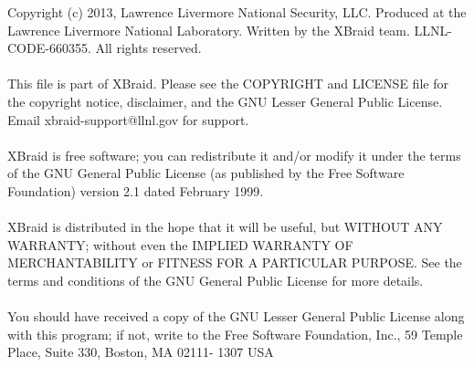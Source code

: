 \documentclass[twoside]{article}
\begin{document}
\begin{titlepage}
Copyright (c) 2013,  Lawrence Livermore National Security, LLC.
Produced at the Lawrence Livermore National Laboratory.
Written by the XBraid team. LLNL-CODE-660355.  All rights reserved.
~\\~\\ 
This file is part of XBraid. Please see the COPYRIGHT and LICENSE file 
for the copyright notice, disclaimer, and the GNU Lesser General Public License.
Email xbraid-support@llnl.gov for support.
~\\~\\
XBraid is free software; you can redistribute it and/or modify it under the
terms of the GNU General Public License (as published by the Free Software
Foundation) version 2.1 dated February 1999.
~\\~\\
XBraid is distributed in the hope that it will be useful, but WITHOUT ANY
WARRANTY; without even the IMPLIED WARRANTY OF MERCHANTABILITY or FITNESS FOR A
PARTICULAR PURPOSE. See the terms and conditions of the GNU General Public
License for more details.
~\\~\\
You should have received a copy of the GNU Lesser General Public License along
with this program; if not, write to the Free Software Foundation, Inc., 59
Temple Place, Suite 330, Boston, MA 02111- 1307 USA

\end{titlepage}
\tableofcontents
{}
\hypersetup{pageanchor=true}

\end{document}
